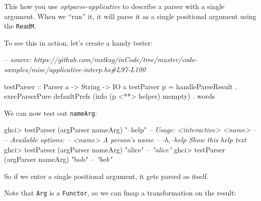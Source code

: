 \documentclass[]{article}
\newenvironment{Shaded}{}{}
\newcommand{\CommentTok}[1]{\textcolor[rgb]{0.38,0.63,0.69}{\textit{#1}}}
\newcommand{\DataTypeTok}[1]{\textcolor[rgb]{0.56,0.13,0.00}{#1}}
\newcommand{\FunctionTok}[1]{\textcolor[rgb]{0.02,0.16,0.49}{#1}}
\newcommand{\NormalTok}[1]{#1}
\newcommand{\OperatorTok}[1]{\textcolor[rgb]{0.40,0.40,0.40}{#1}}
\newcommand{\OtherTok}[1]{\textcolor[rgb]{0.00,0.44,0.13}{#1}}
\newcommand{\StringTok}[1]{\textcolor[rgb]{0.25,0.44,0.63}{#1}}
\begin{document}
This how you use \emph{optparse-applicative} to describe a parser with a single
argument. When we ``run'' it, it will parse it as a single positional argument
using the \texttt{ReadM}.

To see this in action, let's create a handy tester:

\begin{Shaded}
\begin{Highlighting}[]
\CommentTok{-- source: https://github.com/mstksg/inCode/tree/master/code-samples/misc/applicative-interp.hs#L97-L100}

\OtherTok{testParser ::} \DataTypeTok{Parser}\NormalTok{ a }\OtherTok{->} \DataTypeTok{String} \OtherTok{->} \DataTypeTok{IO}\NormalTok{ a}
\NormalTok{testParser p }\OtherTok{=}\NormalTok{ handleParseResult}
             \OperatorTok{.}\NormalTok{ execParserPure defaultPrefs (info (p }\OperatorTok{<**>}\NormalTok{ helper) }\FunctionTok{mempty}\NormalTok{)}
             \OperatorTok{.} \FunctionTok{words}
\end{Highlighting}
\end{Shaded}

We can now test out \texttt{nameArg}:

\begin{Shaded}
\begin{Highlighting}[]
\NormalTok{ghci}\OperatorTok{>}\NormalTok{ testParser (argParser nameArg) }\StringTok{"--help"}
\CommentTok{-- Usage: <interactive> <name>}
\CommentTok{--}
\CommentTok{-- Available options:}
\CommentTok{--   <name>                   A person's name}
\CommentTok{--   -h,--help                Show this help text}
\NormalTok{ghci}\OperatorTok{>}\NormalTok{ testParser (argParser nameArg) }\StringTok{"alice"}
\CommentTok{-- "alice"}
\NormalTok{ghci}\OperatorTok{>}\NormalTok{ testParser (argParser nameArg) }\StringTok{"bob"}
\CommentTok{-- "bob"}
\end{Highlighting}
\end{Shaded}

So if we enter a single positional argument, it gets parsed as itself.

Note that \texttt{Arg} is a \texttt{Functor}, so we can fmap a transformation on
the result:

\begin{Shaded}
\end{Shaded}
\end{document}
